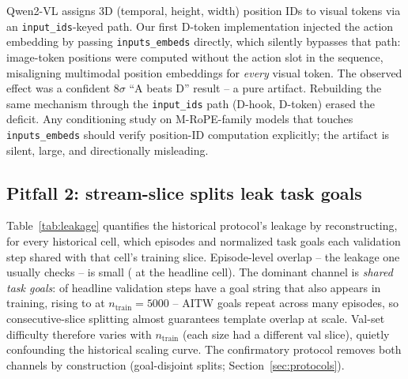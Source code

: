 Qwen2-VL assigns 3D (temporal, height, width) position IDs to visual
tokens via an \texttt{input\_ids}-keyed path. Our first D-token
implementation injected the action embedding by passing
\texttt{inputs\_embeds} directly, which silently bypasses that path:
image-token positions were computed without the action slot in the
sequence, misaligning multimodal position embeddings for \emph{every}
visual token. The observed effect was a confident $8\sigma$ ``A beats D''
result -- a pure artifact. Rebuilding the same mechanism through the
\texttt{input\_ids} path (D-hook, D-token) erased the deficit. Any
conditioning study on M-RoPE-family models that touches
\texttt{inputs\_embeds} should verify position-ID computation explicitly;
the artifact is silent, large, and directionally misleading.

\subsection{Pitfall 2: stream-slice splits leak task goals}
\label{sec:leakage}

Table~\ref{tab:leakage} quantifies the historical protocol's leakage by
reconstructing, for every historical cell, which episodes and normalized
task goals each validation step shared with that cell's training slice.
Episode-level overlap -- the leakage one usually checks -- is small
(\LeakEpMain{} at the headline cell). The dominant channel is
\emph{shared task goals}: \LeakGoalMain{} of headline validation steps
have a goal string that also appears in training, rising to \LeakGoalMax{}
at $n_{\text{train}}{=}5000$ -- AITW goals repeat across many episodes, so
consecutive-slice splitting almost guarantees template overlap at scale.
Val-set difficulty therefore varies with $n_{\text{train}}$ (each size had
a different val slice), quietly confounding the historical scaling curve.
The confirmatory protocol removes both channels by construction
(goal-disjoint splits; Section~\ref{sec:protocols}).

\newcommand{\tableakagefloat}{%
\begin{table}[tb]
\begin{center}\small
\fittab{}
\end{center}
\caption{Leakage in the historical (exploratory) splits: fraction of
validation steps sharing an episode or a normalized task goal with that
cell's training slice. Goal sharing, not episode straddling, is the
dominant channel.}
\label{tab:leakage}
\end{table}}
\ifworkshopbuild\else\tableakagefloat\fi

